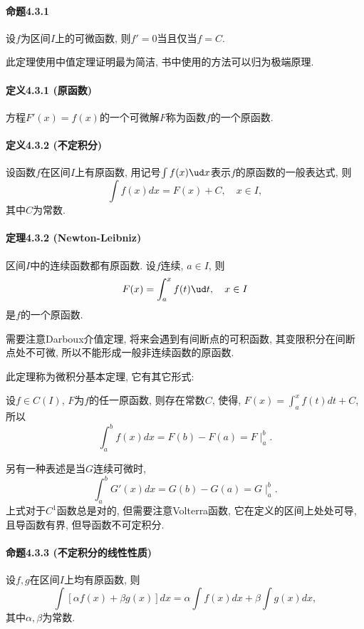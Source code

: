 \paragraph{命题4.3.1}

设$f$为区间$I$上的可微函数, 则$f'=0$当且仅当$f=C$.

此定理使用中值定理证明最为简洁, 书中使用的方法可以归为极端原理.

\paragraph{定义4.3.1 (原函数)}

方程$F'(x)=f(x)$的一个可微解$F$称为函数$f$的一个原函数.

\paragraph{定义4.3.2 (不定积分)}

设函数$f$在区间$I$上有原函数, 用记号$\int f(x)\ud x$表示$f$的原函数的一般表达式, 则
\[
\int f(x)dx=F(x)+C,\quad x\in I,
\]
其中$C$为常数.

\paragraph{定理4.3.2 (Newton-Leibniz)}

区间$I$中的连续函数都有原函数. 设$f$连续, $a\in I$, 则
\[
F(x)=\int_{a}^{x}f(t)\ud t,\quad x\in I
\]
是$f$的一个原函数.

需要注意Darboux介值定理, 将来会遇到有间断点的可积函数, 其变限积分在间断点处不可微, 所以不能形成一般非连续函数的原函数.

此定理称为微积分基本定理, 它有其它形式:

设$f\in C(I)$, $F$为$f$的任一原函数, 则存在常数$C$, 使得, $F(x)=\int_{a}^{x}f(t)dt+C$,
所以
\[
\int_{a}^{b}f(x)dx=F(b)-F(a)=F\mid_{a}^{b}.
\]

另有一种表述是当$G$连续可微时, 
\[
\int_{a}^{b}G'(x)dx=G(b)-G(a)=G\mid_{a}^{b}.
\]
上式对于$C^{1}$函数总是对的, 但需要注意Volterra函数, 它在定义的区间上处处可导, 且导函数有界, 但导函数不可定积分.

\paragraph{命题4.3.3 (不定积分的线性性质)}

设$f,g$在区间$I$上均有原函数, 则
\[
\int[\alpha f(x)+\beta g(x)]dx=\alpha\int f(x)dx+\beta\int g(x)dx,
\]
其中$\alpha,\beta$为常数.

